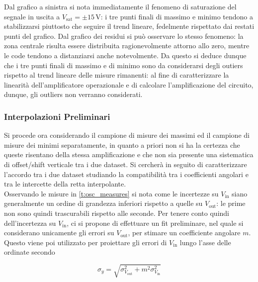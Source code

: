\documentclass[a4paper,11pt]{article} %
\begin{document}
\noindent Dal grafico a sinistra si nota immediatamente il fenomeno di saturazione del segnale in uscita a
$V_{\text{sat}}=\pm15\,\si{\volt}$: i tre punti finali di massimo e minimo tendono a stabilizzarsi piuttosto che seguire
il trend lineare, fedelmente rispettato dai restati punti del grafico. Dal grafico dei residui si può osservare lo
stesso fenomeno: la zona centrale risulta essere distribuita ragionevolmente attorno allo zero, mentre le code tendono a
distanziarsi anche notevolmente. Da questo si deduce dunque che i tre punti finali di massimo e di minimo sono da
considerarsi degli outiers rispetto al trend lineare delle misure rimanenti: al fine di caratterizzare la
linearità dell'amplificatore operazionale e di calcolare l'amplificazione del circuito, dunque, gli outliers non
verranno considerati.


\subsubsection{Interpolazioni Preliminari}\label{s:pre}
Si procede ora considerando il campione di misure dei massimi ed il campione di misure dei minimi separatamente, in
quanto a priori non si ha la certezza che queste risentano della stessa amplificazione e che non sia presente una
sistematica di offset/shift verticale tra i due dataset. Si cercherà in seguito di caratterizzare l'accordo tra i due dataset
studiando la compatibilità tra i coefficienti angolari e tra le intercette della retta interpolante.\\
Osservando le misure in  \autoref{t:osc_measures} si nota come le incertezze su $V_{\text{in}}$ siano generalmente un
ordine di grandezza inferiori rispetto a quelle su $V_{\text{out}}$: le prime non sono quindi trascurabili rispetto alle
seconde. Per tenere conto quindi dell'incertezza su $V_{\text{in}}$, ci si propone di effettuare un fit
preliminare, nel quale si considerano unicamente gli errori su $V_{\text{out}}$, per stimare un coefficiente angolare
$m$. Questo viene poi utilizzato per proiettare gli errori di $V_{\text{in}}$ lungo l'asse delle ordinate secondo 

\begin{equation}\label{e:proj}
	\sigma_{y} = \sqrt{	\sigma_{V_{\text{out}}}^2	+	m^2	\sigma_{V_{\text{in}}}^2	}
\end{equation}
\end{document}
